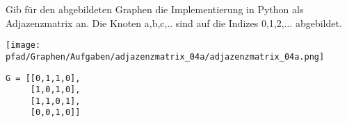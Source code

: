 ﻿\question[3]
Gib für den abgebildeten Graphen die Implementierung in Python als Adjazenzmatrix an.
Die Knoten a,b,c,.. sind auf die Indizes 0,1,2,... abgebildet.

\texttt{[image: \\pfad/Graphen/Aufgaben/adjazenzmatrix\_04a/adjazenzmatrix\_04a.png]}
\begin{solutionbox}{5cm}
\begin{lstlisting}
G = [[0,1,1,0],
     [1,0,1,0],
     [1,1,0,1],
     [0,0,1,0]]
\end{lstlisting}
\end{solutionbox}
